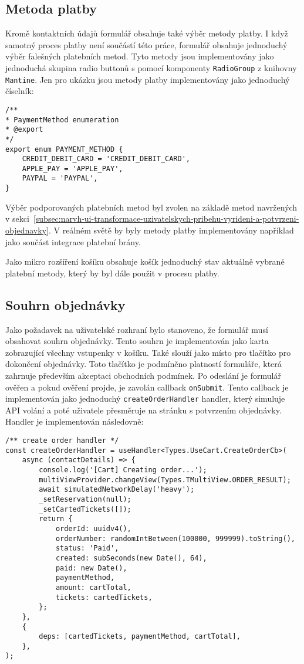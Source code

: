 \subsection{Metoda platby}
\label{subsec:implementace-checkout-payment-method}
Kromě kontaktních údajů formulář obsahuje také výběr metody platby.
I když samotný proces platby není součástí této práce, formulář obsahuje jednoduchý výběr falešných platebních metod.
Tyto metody jsou implementovány jako jednoduchá skupina radio buttonů s pomocí komponenty \texttt{RadioGroup} z knihovny \texttt{Mantine}.
Jen pro ukázku jsou metody platby implementovány jako jednoduchý číselník:

\begin{verbatim}
/**
* PaymentMethod enumeration
* @export
*/
export enum PAYMENT_METHOD {
	CREDIT_DEBIT_CARD = 'CREDIT_DEBIT_CARD',
	APPLE_PAY = 'APPLE_PAY',
	PAYPAL = 'PAYPAL',
}
\end{verbatim}

Výběr podporovaných platebních metod byl zvolen na základě metod navržených v sekci~\ref{subsec:narvh-ui-transformace-uzivatelskych-pribehu-vyrideni-a-potvrzeni-objednavky}.
V reálném světě by byly metody platby implementovány například jako součást integrace platební brány.

Jako mikro rozšíření košíku obsahuje košík jednoduchý stav aktuálně vybrané platební metody, který by byl dále použit v procesu platby.

\subsection{Souhrn objednávky}
\label{subsec:implementace-checkout-souhrn}
Jako požadavek na uživatelské rozhraní bylo stanoveno, že formulář musí obsahovat souhrn objednávky.
Tento souhrn je implementován jako karta zobrazující všechny vstupenky v košíku.
Také slouží jako místo pro tlačítko pro dokončení objednávky.
Toto tlačítko je podmíněno platností formuláře, která zahrnuje především akceptaci obchodních podmínek.
Po odeslání je formulář ověřen a pokud ověření projde, je zavolán callback \texttt{onSubmit}.
Tento callback je implementován jako jednoduchý \texttt{createOrderHandler} handler, který simuluje API volání a poté uživatele přesměruje na stránku s potvrzením objednávky.
Handler je implementován následovně:

\begin{verbatim}
/** create order handler */
const createOrderHandler = useHandler<Types.UseCart.CreateOrderCb>(
	async (contactDetails) => {
		console.log('[Cart] Creating order...');
		multiViewProvider.changeView(Types.TMultiView.ORDER_RESULT);
		await simulatedNetworkDelay('heavy');
		_setReservation(null);
		_setCartedTickets([]);
		return {
			orderId: uuidv4(),
			orderNumber: randomIntBetween(100000, 999999).toString(),
			status: 'Paid',
			created: subSeconds(new Date(), 64),
			paid: new Date(),
			paymentMethod,
			amount: cartTotal,
			tickets: cartedTickets,
		};
	},
	{
		deps: [cartedTickets, paymentMethod, cartTotal],
	},
);
\end{verbatim}

